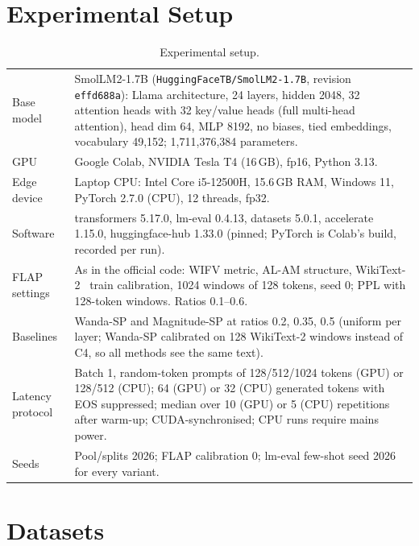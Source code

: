 \documentclass[11pt,a4paper]{article}
\begin{document}
\section{Experimental Setup}
\label{sec:setup}
\begin{table}[!htbp]
\centering\small
\begin{tabularx}{\linewidth}{lX}
\toprule
Base model & SmolLM2-1.7B (\texttt{HuggingFaceTB/SmolLM2-1.7B}, revision \texttt{effd688a}): Llama architecture, 24 layers,
hidden 2048, 32 attention heads with 32 key/value heads (full multi-head attention), head dim 64, MLP 8192,
no biases, tied embeddings, vocabulary 49{,}152; 1{,}711{,}376{,}384 parameters. \\
GPU & Google Colab, NVIDIA Tesla T4 (16\,GB), fp16, Python 3.13. \\
Edge device & Laptop CPU: Intel Core i5-12500H, 15.6\,GB RAM, Windows 11, PyTorch 2.7.0 (CPU), 12 threads, fp32. \\
Software & transformers 5.17.0, lm-eval 0.4.13, datasets 5.0.1, accelerate 1.15.0, huggingface-hub 1.33.0
(pinned; PyTorch is Colab's build, recorded per run). \\
FLAP settings & As in the official code: WIFV metric, AL-AM structure, WikiText-2~\citep{merity2016wikitext} train
calibration, 1024 windows of 128 tokens, seed 0; PPL with 128-token windows. Ratios 0.1--0.6. \\
Baselines & Wanda-SP and Magnitude-SP at ratios 0.2, 0.35, 0.5 (uniform per layer; Wanda-SP calibrated on
128 WikiText-2 windows instead of C4, so all methods see the same text). \\
Latency protocol & Batch 1, random-token prompts of 128/512/1024 tokens (GPU) or 128/512 (CPU); 64 (GPU) or 32 (CPU)
generated tokens with EOS suppressed; median over 10 (GPU) or 5 (CPU) repetitions after warm-up; CUDA-synchronised; CPU runs require mains power. \\
Seeds & Pool/splits 2026; FLAP calibration 0; lm-eval few-shot seed 2026 for every variant. \\
\bottomrule
\end{tabularx}
\caption{Experimental setup.}
\end{table}

\section{Datasets}
\label{sec:data}

\end{document}

